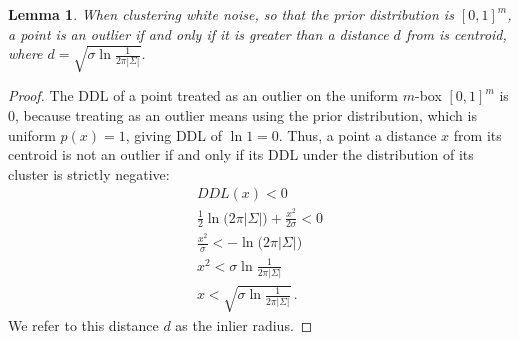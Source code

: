\documentclass[a4paper,fleqn]{cas-sc}
\newtheorem{lemma}[theorem]{Lemma}
\theoremstyle{remark}
\begin{document}
\begin{lemma} \label{lemma:d}
When clustering white noise, so that the prior distribution is $[0,1]^m$, a point is an outlier if and only if it is greater than a distance $d$ from is centroid, where $d=\sqrt{\sigma \ln{\frac{1}{2\pi |\Sigma|}}}$.
\end{lemma}
\begin{proof}
The DDL of a point treated as an outlier on the uniform $m$-box $[0,1]^m$ is 0, because treating as an outlier means using the prior distribution, which is uniform $p(x)=1$, giving DDL of $\ln{1} = 0$. Thus, a point a distance $x$ from its centroid is not an outlier if and only if its DDL under the distribution of its cluster is strictly negative:
\begin{gather*}
    DDL(x) < 0 \\
    \frac{1}{2} \ln{(2\pi |\Sigma|}) + \frac{x^2}{2\sigma} < 0 \\
    \frac{x^2}{\sigma} < -\ln{(2\pi |\Sigma|}) \\
    x^2 < \sigma \ln{\frac{1}{2\pi |\Sigma|}} \\
    x < \sqrt{\sigma \ln{\frac{1}{2\pi |\Sigma|}}} \,.
\end{gather*}
We refer to this distance $d$ as the inlier radius.
\end{proof}
\end{document}
